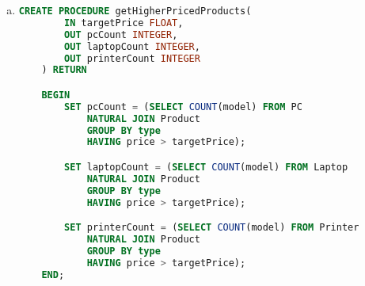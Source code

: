 \documentclass[12pt]{article}
\begin{document}
\begin{enumerate}[1.]
\begin{enumerate}[a)]
        \item

    \begin{lstlisting}[language=SQL]
    CREATE PROCEDURE getHigherPricedProducts(
        IN targetPrice FLOAT,
        OUT pcCount INTEGER,
        OUT laptopCount INTEGER,
        OUT printerCount INTEGER
    ) RETURN

    BEGIN
        SET pcCount = (SELECT COUNT(model) FROM PC
            NATURAL JOIN Product
            GROUP BY type
            HAVING price > targetPrice);

        SET laptopCount = (SELECT COUNT(model) FROM Laptop
            NATURAL JOIN Product
            GROUP BY type
            HAVING price > targetPrice);

        SET printerCount = (SELECT COUNT(model) FROM Printer
            NATURAL JOIN Product
            GROUP BY type
            HAVING price > targetPrice);
    END;

    \end{lstlisting}


    \end{enumerate}
\end{enumerate}
\end{document}
